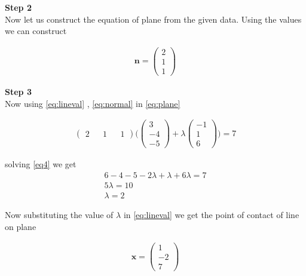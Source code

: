 \documentclass[10pt,a4paper,twocolumn]{article}
\newcommand{\myvec}[1]{\ensuremath{\begin{pmatrix}#1\end{pmatrix}}}
\numberwithin{equation}{section}
\begin{document}
\textbf{Step 2}\\
Now let us construct the equation of plane from the given data.
Using the values we can construct 

\begin{align}
\textbf{n}=\myvec{ 2\\ 1\\1}\label{eq:normal}
\end{align}

\textbf{Step 3}\\
Now using \eqref{eq:lineval} , \eqref{eq:normal}   in \eqref{eq:plane}

\begin{align}
\myvec{ 2 && 1 && 1} \Bigg( \myvec{3 \\-4 \\-5}+\lambda\myvec{-1 \\1 \\6} \Bigg)=7\label{eq4}
\end{align}

solving \eqref{eq4} we get 
\begin{align}  
6 -4 -5-2\lambda+ \lambda+ 6 \lambda=7 \\ 
5 \lambda=10 \\
\lambda=2 \label{eq5} 
\end{align}

Now substituting the value of $\lambda$ in \eqref{eq:lineval} we get the point of contact of line on plane


\begin{align}
\textbf{x}=\myvec{1\\-2\\7 }
\end{align}
\pagebreak
\end{document}
